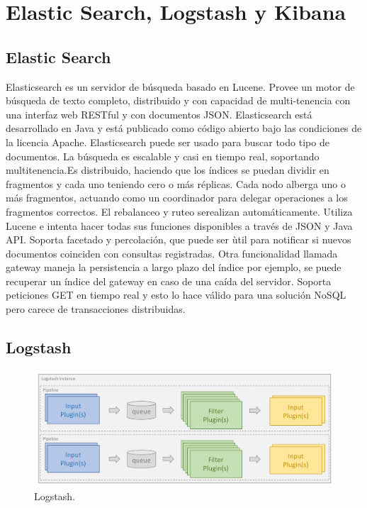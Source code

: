 \chapter{Elastic Search, Logstash y Kibana}\label{elastic-search-kibana-logstash}

\section{Elastic Search}\label{elastic-search}
Elasticsearch es un servidor de búsqueda basado en Lucene. Provee un motor de búsqueda de texto completo, distribuido y con capacidad de multi-tenencia con una interfaz web RESTful y con documentos JSON. Elasticsearch está desarrollado en Java y está publicado como código abierto bajo las condiciones de la licencia Apache.
Elasticsearch puede ser usado para buscar todo tipo de documentos. La búsqueda es escalable y casi en tiempo real, soportando multitenencia.Es distribuido, haciendo que los índices se puedan dividir en fragmentos y cada uno teniendo cero o más réplicas. Cada nodo alberga uno o más fragmentos, actuando como un coordinador para delegar operaciones a los fragmentos correctos. El rebalanceo y ruteo serealizan automáticamente.
Utiliza Lucene e intenta hacer todas sus funciones disponibles a través de JSON y Java API. Soporta facetado y percolación, que puede ser ùtil para notificar si nuevos documentos coinciden con consultas registradas.
Otra funcionalidad llamada gateway maneja la persistencia a largo plazo del índice por ejemplo, se puede recuperar un índice del gateway en caso de una caída del servidor. Soporta peticiones GET en tiempo real y esto lo hace válido para una solución NoSQL pero carece de transacciones distribuidas.
\section{Logstash}\label{logstash-description}

\begin{figure}
 \centering
  \includegraphics[width=0.5\linewidth]{./imagenes/logstash-pipeline.png}
  \caption{Logstash.}
  \label{fig:logstash}
\end{figure}

